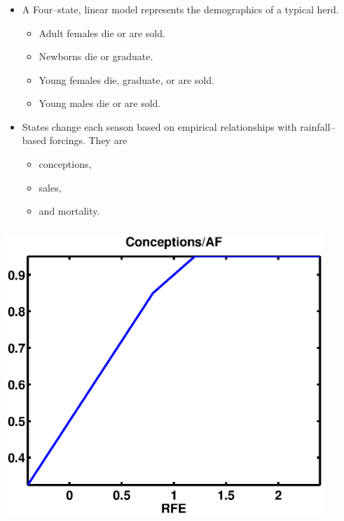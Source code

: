 \documentclass[mathserif]{beamer}
\begin{document}
\begin{frame}
\begin{center}
\frametitle{\insertsection}
\begin{itemize}
\item A Four--state, linear model represents the demographics of a typical herd.
\begin{itemize}
\item Adult females die or are sold.
\item Newborns die or graduate.
\item Young females die, graduate, or are sold.
\item Young males die or are sold.
\end{itemize}
\item States change each season based on empirical relationships with rainfall--based forcings. They are
\begin{itemize}
\item conceptions,
\item sales,
\item and mortality.
\end{itemize}
\end{itemize}
\end{center}
\end{frame}

\begin{frame}
\begin{center}
\frametitle{\insertsection}
\includegraphics[width=0.9\textwidth]{conceptions}
\end{center}
\end{frame}
\end{document}
